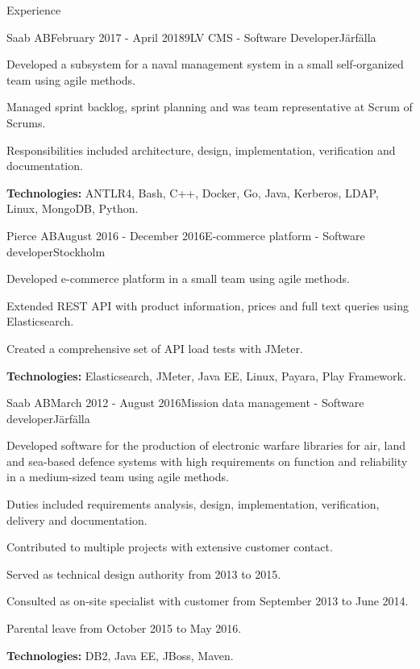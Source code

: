 \documentclass{resume}
\begin{document}
\begin{rSection}{Experience}
    \newpage
    \begin{rSubsection}{Saab AB}{February 2017 - April 2018}{9LV CMS - Software Developer}{Järfälla}
      \item Developed a subsystem for a naval management system in a small self-organized team using agile methods.
      \item Managed sprint backlog, sprint planning and was team representative at Scrum of Scrums.
      \item Responsibilities included architecture, design, implementation, verification and documentation.
      \item \textbf{Technologies:}  ANTLR4, Bash, C++, Docker, Go, Java, Kerberos, LDAP, Linux, MongoDB, Python.
    \end{rSubsection}

    \begin{rSubsection}{Pierce AB}{August 2016 - December 2016}{E-commerce platform - Software developer}{Stockholm}
      \item Developed e-commerce platform in a small team using agile methods.
      \item Extended REST API with product information, prices and full text queries using Elasticsearch.
      \item Created a comprehensive set of API load tests with JMeter.
      \item \textbf{Technologies:} Elasticsearch, JMeter, Java EE, Linux, Payara, Play Framework.
    \end{rSubsection}

    \begin{rSubsection}{Saab AB}{March 2012 - August 2016}{Mission data management - Software developer}{Järfälla}
      \item Developed software for the production of electronic warfare libraries for air, land and sea-based defence systems with high requirements on function and reliability in a medium-sized team using agile methods.
      \item Duties included requirements analysis, design, implementation, verification, delivery and documentation.
      \item Contributed to multiple projects with extensive customer contact.
      \item Served as technical design authority from 2013 to 2015.
      \item Consulted as on-site specialist with customer from September 2013 to June 2014.
      \item Parental leave from October 2015 to May 2016.
      \item \textbf{Technologies:}  DB2, Java EE, JBoss, Maven.
    \end{rSubsection}


\end{rSection}
\end{document}
